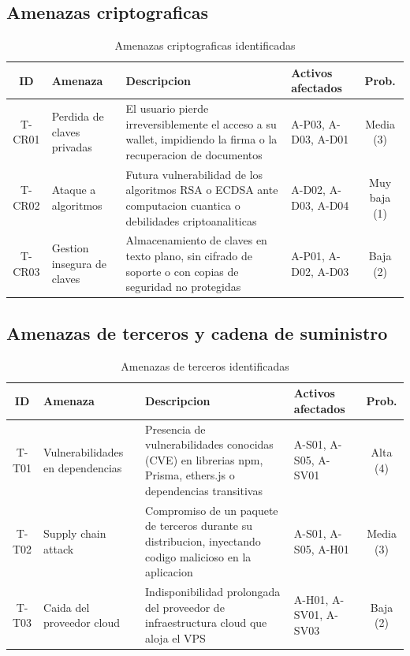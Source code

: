 \documentclass[11pt, a4paper]{article}
\begin{document}
\subsection{Amenazas criptograficas}

\begin{table}[H]
\centering
\renewcommand{\arraystretch}{1.4}
\small
\begin{tabular}{|c|l|p{4.5cm}|l|c|}
\hline
\textbf{ID} & \textbf{Amenaza} & \textbf{Descripcion} & \textbf{Activos afectados} & \textbf{Prob.} \\
\hline
T-CR01 & Perdida de claves privadas & El usuario pierde irreversiblemente el acceso a su wallet, impidiendo la firma o la recuperacion de documentos & A-P03, A-D03, A-D01 & Media (3) \\
\hline
T-CR02 & Ataque a algoritmos & Futura vulnerabilidad de los algoritmos RSA o ECDSA ante computacion cuantica o debilidades criptoanaliticas & A-D02, A-D03, A-D04 & Muy baja (1) \\
\hline
T-CR03 & Gestion insegura de claves & Almacenamiento de claves en texto plano, sin cifrado de soporte o con copias de seguridad no protegidas & A-P01, A-D02, A-D03 & Baja (2) \\
\hline
\end{tabular}
\caption{Amenazas criptograficas identificadas}
\label{tab:amenazas-crypto}
\end{table}

\subsection{Amenazas de terceros y cadena de suministro}

\begin{table}[H]
\centering
\renewcommand{\arraystretch}{1.4}
\small
\begin{tabular}{|c|l|p{4.5cm}|l|c|}
\hline
\textbf{ID} & \textbf{Amenaza} & \textbf{Descripcion} & \textbf{Activos afectados} & \textbf{Prob.} \\
\hline
T-T01 & Vulnerabilidades en dependencias & Presencia de vulnerabilidades conocidas (CVE) en librerias npm, Prisma, ethers.js o dependencias transitivas & A-S01, A-S05, A-SV01 & Alta (4) \\
\hline
T-T02 & Supply chain attack & Compromiso de un paquete de terceros durante su distribucion, inyectando codigo malicioso en la aplicacion & A-S01, A-S05, A-H01 & Media (3) \\
\hline
T-T03 & Caida del proveedor cloud & Indisponibilidad prolongada del proveedor de infraestructura cloud que aloja el VPS & A-H01, A-SV01, A-SV03 & Baja (2) \\
\hline
\end{tabular}
\caption{Amenazas de terceros identificadas}
\label{tab:amenazas-terceros}
\end{table}
\end{document}

